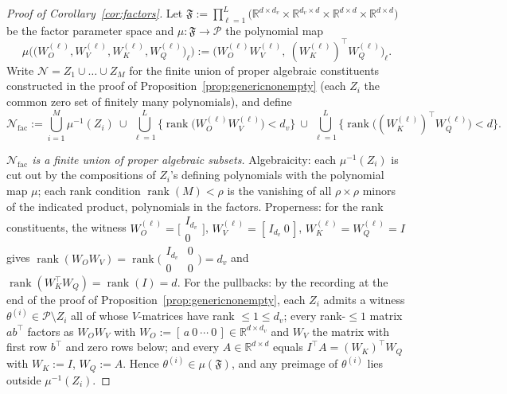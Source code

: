\documentclass[11pt]{article}
\theoremstyle{definition}
\theoremstyle{remark}
\theoremstyle{plain}
\newcommand{\R}{\mathbb{R}}
\newcommand{\cP}{\mathcal{P}}
\newcommand{\cN}{\mathcal{N}}
\newcommand{\rank}{\operatorname{rank}}
\begin{document}
\begin{proof}[Proof of Corollary~\ref{cor:factors}]
Let
$\mathfrak F:=\prod_{\ell=1}^L\big(\R^{d\times d_v}\times\R^{d_v\times d}
\times\R^{d\times d}\times\R^{d\times d}\big)$ be the factor parameter space and
$\mu:\mathfrak F\to\cP$ the polynomial map
\[
\mu\Big(\big(W_O^{(\ell)},W_V^{(\ell)},W_K^{(\ell)},W_Q^{(\ell)}\big)_\ell\Big)
:=\Big(W_O^{(\ell)}W_V^{(\ell)},\ (W_K^{(\ell)})^\top W_Q^{(\ell)}\Big)_\ell .
\]
Write $\cN=Z_1\cup\dots\cup Z_M$ for the finite union of proper algebraic
constituents constructed in the proof of Proposition~\ref{prop:genericnonempty}
(each $Z_i$ the common zero set of finitely many polynomials), and define
\[
\cN_{\mathrm{fac}}:=\bigcup_{i=1}^M\mu^{-1}(Z_i)\ \cup\
\bigcup_{\ell=1}^L\big\{\rank\big(W_O^{(\ell)}W_V^{(\ell)}\big)<d_v\big\}\ \cup\
\bigcup_{\ell=1}^L\big\{\rank\big((W_K^{(\ell)})^\top W_Q^{(\ell)}\big)<d\big\}.
\]

\emph{$\cN_{\mathrm{fac}}$ is a finite union of proper algebraic subsets.}
Algebraicity: each $\mu^{-1}(Z_i)$ is cut out by the compositions of $Z_i$'s defining
polynomials with the polynomial map $\mu$; each rank condition
$\rank(M)<\rho$ is the vanishing of all $\rho\times\rho$ minors of the indicated
product, polynomials in the factors.  Properness: for the rank constituents, the
witness $W_O^{(\ell)}=\big[\begin{smallmatrix}I_{d_v}\\0\end{smallmatrix}\big]$,
$W_V^{(\ell)}=[\,I_{d_v}\ 0\,]$, $W_K^{(\ell)}=W_Q^{(\ell)}=I$ gives
$\rank(W_OW_V)=\rank\big(\begin{smallmatrix}I_{d_v}&0\\0&0\end{smallmatrix}\big)=d_v$
and $\rank(W_K^\top W_Q)=\rank(I)=d$.  For the pullbacks: by the recording at the end
of the proof of Proposition~\ref{prop:genericnonempty}, each $Z_i$ admits a witness
$\theta^{(i)}\in\cP\setminus Z_i$ all of whose $V$-matrices have rank $\le1\le d_v$;
every rank-$\le1$ matrix $ab^\top$ factors as $W_OW_V$ with
$W_O:=[\,a\ 0\ \cdots\ 0\,]\in\R^{d\times d_v}$ and $W_V$ the matrix with first row
$b^\top$ and zero rows below; and every $A\in\R^{d\times d}$ equals
$I^\top A=(W_K)^\top W_Q$ with $W_K:=I$, $W_Q:=A$.  Hence
$\theta^{(i)}\in\mu(\mathfrak F)$, and any preimage of $\theta^{(i)}$ lies outside
$\mu^{-1}(Z_i)$.


\end{proof}
\end{document}

